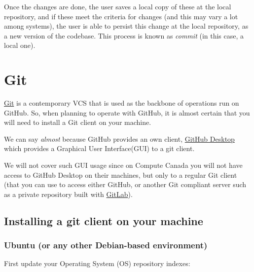 \documentclass[
]{book}
\newenvironment{Shaded}{\begin{snugshade}}{\end{snugshade}}
\newcommand{\ExtensionTok}[1]{#1}
\newcommand{\NormalTok}[1]{#1}
\begin{document}
Once the changes are done, the user saves a local copy of these at the local repository,
and if these meet the criteria for changes (and this may vary a lot among systems),
the user is able to persist this change at the local repository, as a new version of
the codebase. This process is known as \emph{commit} (in this case, a local one).

\hypertarget{git}{%
\section{Git}\label{git}}

\href{https://git-scm.com/}{Git} is a contemporary VCS that is used as the backbone
of operations run on GitHub. So, when planning to operate with GitHub, it is
almost certain that you will need to install a Git client on your machine.

We can say \emph{almost} because GitHub provides an own client,
\href{https://desktop.github.com/}{GitHub Desktop} which provides a Graphical User
Interface(GUI) to a git client.

We will not cover such GUI usage since on Compute Canada you will not have access
to GitHub Desktop on their machines, but only to
a regular Git client (that you can use to access either GitHub, or another Git
compliant server such as a private repository built with
\href{https://about.gitlab.com/}{GitLab}).

\hypertarget{installing-a-git-client-on-your-machine}{%
\subsection{Installing a git client on your machine}\label{installing-a-git-client-on-your-machine}}

\hypertarget{ubuntu-or-any-other-debian-based-environment}{%
\subsubsection{Ubuntu (or any other Debian-based environment)}\label{ubuntu-or-any-other-debian-based-environment}}

First update your Operating System (OS) repository indexes:

\begin{Shaded}
\end{Shaded}
\end{document}
